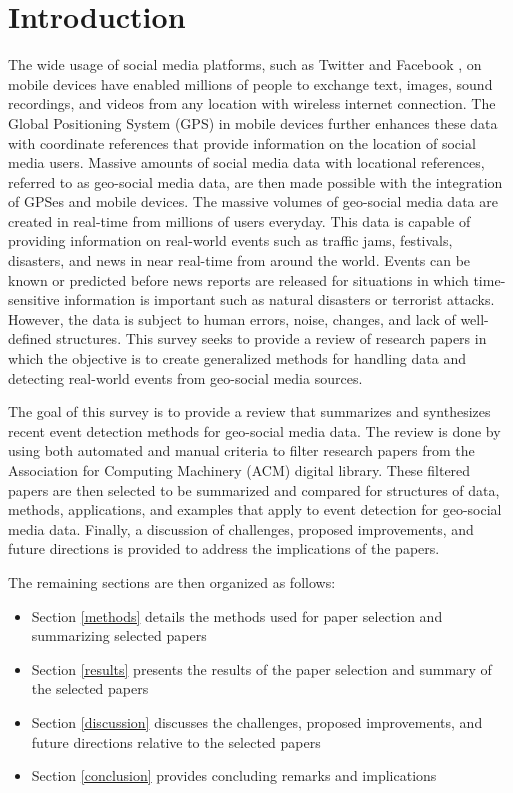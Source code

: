 \section{Introduction} \label{introduction}

The wide usage of social media platforms, such as Twitter \cite{Twitter:2017} and Facebook \cite{Facebook:2017}, on mobile devices have enabled millions of people to exchange text, images, sound recordings, and videos from any location with wireless internet connection. The Global Positioning System (GPS) in mobile devices further enhances these data with coordinate references that provide information on the location of social media users. Massive amounts of social media data with locational references, referred to as geo-social media data, are then made possible with the integration of GPSes and mobile devices. The massive volumes of geo-social media data are created in real-time from millions of users everyday. This data is capable of providing information on real-world events such as traffic jams, festivals, disasters, and news in near real-time from around the world. Events can be known or predicted before news reports are released for situations in which time-sensitive information is important such as natural disasters or terrorist attacks. However, the data is subject to human errors, noise, changes, and lack of well-defined structures. This survey seeks to provide a review of research papers in which the objective is to create generalized methods for handling data and detecting real-world events from geo-social media sources.

  The goal of this survey is to provide a review that summarizes and synthesizes recent event detection methods for geo-social media data. The review is done by using both automated and manual criteria to filter research papers from the Association for Computing Machinery (ACM) digital library. These filtered papers are then selected to be summarized and compared for structures of data, methods, applications, and examples that apply to event detection for geo-social media data. Finally, a discussion of challenges, proposed improvements, and future directions is provided to address the implications of the papers.

  The remaining sections are then organized as follows:

\begin{itemize}
  \item Section \ref{methods} details the methods used for paper selection and summarizing selected papers
  \item Section \ref{results} presents the results of the paper selection and summary of the selected papers
  \item Section \ref{discussion} discusses the challenges, proposed improvements, and future directions relative to the selected papers
  \item Section \ref{conclusion} provides concluding remarks and implications
\end{itemize}

